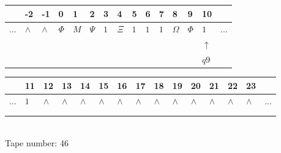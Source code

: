 \documentclass[11pt]{article}
\begin{document}
\begin{table}[H]
\centering
\begin{tabular}{lllllllllllllll}
 & -2 & -1 & 0 & 1 & 2 & 3 & 4 & 5 & 6 & 7 & 8 & 9 & 10 & \\
\hline
$...$ & \multicolumn{1}{|l|}{$\wedge$} & \multicolumn{1}{|l|}{$\wedge$} & \multicolumn{1}{|l|}{$\Phi$} & \multicolumn{1}{|l|}{$M$} & \multicolumn{1}{|l|}{$\Psi$} & \multicolumn{1}{|l|}{$1$} & \multicolumn{1}{|l|}{$\Xi$} & \multicolumn{1}{|l|}{$1$} & \multicolumn{1}{|l|}{$1$} & \multicolumn{1}{|l|}{$1$} & \multicolumn{1}{|l|}{$\Omega$} & \multicolumn{1}{|l|}{$\Phi$} & \multicolumn{1}{|l|}{$1$} & $...$\\
\hline
&  &  &  &  &  &  &  &  &  &  &  &  & $\uparrow$ &  \\
&  &  &  &  &  &  &  &  &  &  &  &  & $ q9 $ &  \\
\end{tabular}
\begin{tabular}{lllllllllllllll}
 & 11 & 12 & 13 & 14 & 15 & 16 & 17 & 18 & 19 & 20 & 21 & 22 & 23 & \\
\hline
$...$ & \multicolumn{1}{|l|}{$1$} & \multicolumn{1}{|l|}{$\wedge$} & \multicolumn{1}{|l|}{$\wedge$} & \multicolumn{1}{|l|}{$\wedge$} & \multicolumn{1}{|l|}{$\wedge$} & \multicolumn{1}{|l|}{$\wedge$} & \multicolumn{1}{|l|}{$\wedge$} & \multicolumn{1}{|l|}{$\wedge$} & \multicolumn{1}{|l|}{$\wedge$} & \multicolumn{1}{|l|}{$\wedge$} & \multicolumn{1}{|l|}{$\wedge$} & \multicolumn{1}{|l|}{$\wedge$} & \multicolumn{1}{|l|}{$\wedge$} & $...$\\
\hline
&  &  &  &  &  &  &  &  &  &  &  &  &  &  \\
&  &  &  &  &  &  &  &  &  &  &  &  &  &  \\
\end{tabular}
\\
Tape number: 46
\noindent\makebox[\linewidth]{\hdashrule{\textwidth}{1pt}{1pt}}\end{table}
\end{document}
